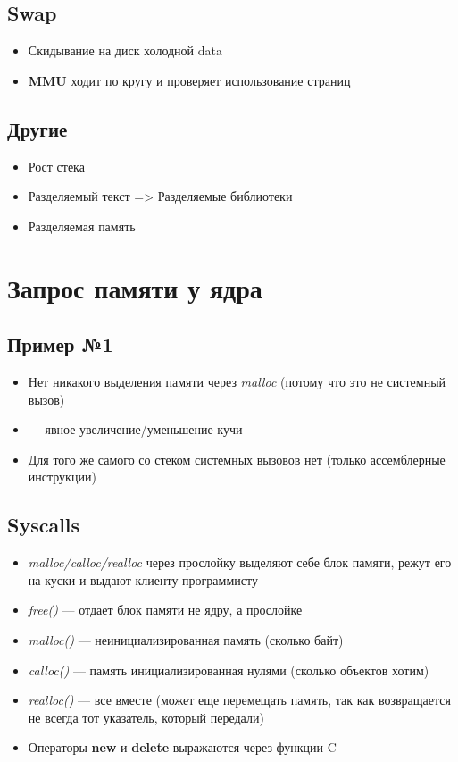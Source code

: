 \documentclass[../../lectures.tex]{subfiles}
\begin{document}
\subsection{Swap}
\begin{itemize}
    \item Скидывание на диск холодной data
    \item \textbf{MMU} ходит по кругу и проверяет использование страниц
\end{itemize}

\subsection{Другие}
\begin{itemize}
    \item Рост стека
    \item Разделяемый текст => Разделяемые библиотеки
    \item Разделяемая память
\end{itemize}

\section{Запрос памяти у ядра}
\subsection{Пример №1}


\begin{itemize}
    \item Нет никакого выделения памяти через \emph{malloc} (потому что это не системный вызов)
    \item {} --- явное увеличение/уменьшение кучи
    \item Для того же самого со стеком системных вызовов нет (только ассемблерные инструкции)
\end{itemize}

\subsection{Syscalls}
\begin{itemize}
    \item \emph{malloc/calloc/realloc} через прослойку выделяют себе блок памяти, режут его на куски и выдают клиенту-программисту
    \item \emph{free()} --- отдает блок памяти не ядру, а прослойке
    \item \emph{malloc()} --- неинициализированная память (сколько байт)
    \item \emph{calloc()} --- память инициализированная нулями (сколько объектов хотим)
    \item \emph{realloc()} --- все вместе (может еще перемещать память, 
          так как возвращается не всегда тот указатель, который передали)
    \item Операторы \textbf{new} и \textbf{delete} выражаются через функции C
\end{itemize}
\end{document}

